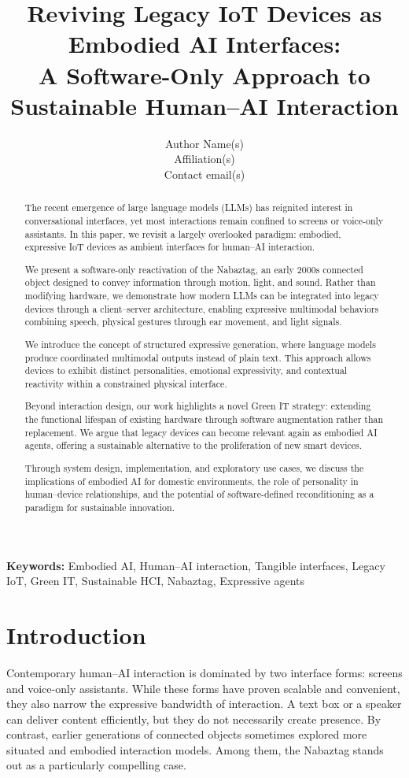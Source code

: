 \documentclass[11pt]{article}
\title{Reviving Legacy IoT Devices as Embodied AI Interfaces:\\A Software-Only Approach to Sustainable Human--AI Interaction}
\author{Author Name(s)\\
\small Affiliation(s)\\
\small Contact email(s)}
\date{}
\begin{document}
\maketitle

\begin{abstract}
The recent emergence of large language models (LLMs) has reignited interest in conversational interfaces, yet most interactions remain confined to screens or voice-only assistants. In this paper, we revisit a largely overlooked paradigm: embodied, expressive IoT devices as ambient interfaces for human--AI interaction.

We present a software-only reactivation of the Nabaztag, an early 2000s connected object designed to convey information through motion, light, and sound. Rather than modifying hardware, we demonstrate how modern LLMs can be integrated into legacy devices through a client--server architecture, enabling expressive multimodal behaviors combining speech, physical gestures through ear movement, and light signals.

We introduce the concept of structured expressive generation, where language models produce coordinated multimodal outputs instead of plain text. This approach allows devices to exhibit distinct personalities, emotional expressivity, and contextual reactivity within a constrained physical interface.

Beyond interaction design, our work highlights a novel Green IT strategy: extending the functional lifespan of existing hardware through software augmentation rather than replacement. We argue that legacy devices can become relevant again as embodied AI agents, offering a sustainable alternative to the proliferation of new smart devices.

Through system design, implementation, and exploratory use cases, we discuss the implications of embodied AI for domestic environments, the role of personality in human--device relationships, and the potential of software-defined reconditioning as a paradigm for sustainable innovation.
\end{abstract}

\textbf{Keywords:} Embodied AI, Human--AI interaction, Tangible interfaces, Legacy IoT, Green IT, Sustainable HCI, Nabaztag, Expressive agents

\section{Introduction}

Contemporary human--AI interaction is dominated by two interface forms: screens and voice-only assistants. While these forms have proven scalable and convenient, they also narrow the expressive bandwidth of interaction. A text box or a speaker can deliver content efficiently, but they do not necessarily create presence. By contrast, earlier generations of connected objects sometimes explored more situated and embodied interaction models. Among them, the Nabaztag stands out as a particularly compelling case.
\end{document}

